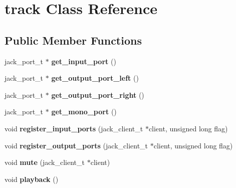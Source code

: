 \hypertarget{classtrack}{}\section{track Class Reference}
\label{classtrack}
\subsection*{Public Member Functions}
\begin{DoxyCompactItemize}
\item 
\mbox{\label{classtrack_a73b8004e9a8b81338ee652049e74f81c}} 
jack\+\_\+port\+\_\+t $\ast$ {\bfseries get\+\_\+input\+\_\+port} ()
\item 
\mbox{\label{classtrack_ae5e47dd339c9d8aae5541b64ff7be99f}} 
jack\+\_\+port\+\_\+t $\ast$ {\bfseries get\+\_\+output\+\_\+port\+\_\+left} ()
\item 
\mbox{\label{classtrack_ad015bc9df6d1b44ae54a6d694b5eb3f2}} 
jack\+\_\+port\+\_\+t $\ast$ {\bfseries get\+\_\+output\+\_\+port\+\_\+right} ()
\item 
\mbox{\label{classtrack_ab9fa8e83130174346e96071751109b11}} 
jack\+\_\+port\+\_\+t $\ast$ {\bfseries get\+\_\+mono\+\_\+port} ()
\item 
\mbox{\label{classtrack_a459b2d8e7cd388a2170e8369ba4f267c}} 
void {\bfseries register\+\_\+input\+\_\+ports} (jack\+\_\+client\+\_\+t $\ast$client, unsigned long flag)
\item 
\mbox{\label{classtrack_a1b34b6eac8eb1c09673b8c750f61b94f}} 
void {\bfseries register\+\_\+output\+\_\+ports} (jack\+\_\+client\+\_\+t $\ast$client, unsigned long flag)
\item 
\mbox{\label{classtrack_aababee8291bfeaf41a31caca35b499fe}} 
void {\bfseries mute} (jack\+\_\+client\+\_\+t $\ast$client)
\item 
\mbox{\label{classtrack_a2f0074c13cebe0a60bf31af31a9dc260}} 
void {\bfseries playback} ()
\item 
\mbox{\label{classtrack_aabf7c10f62e25a3d6a7e6bbed4570531}} 

\end{DoxyCompactItemize}
